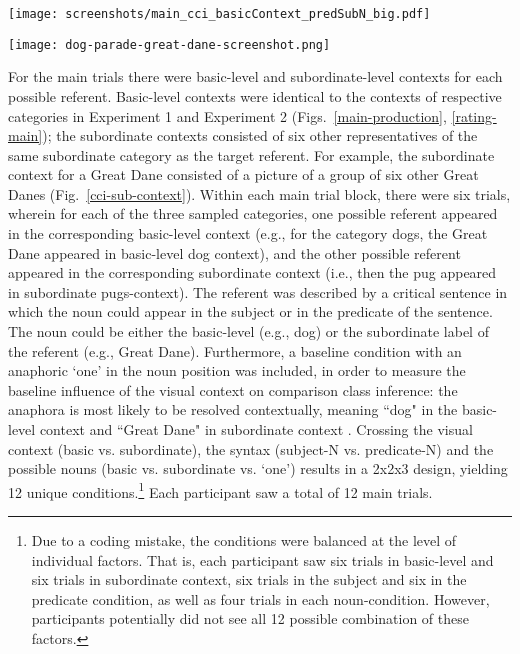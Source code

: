 \begin{figure*}[t]
	\begin{center}
		\texttt{[image: screenshots/main\_cci\_basicContext\_predSubN\_big.pdf]}
	\end{center}
	\vspace{-0.5cm}
	\caption{Example view of a comparison class inference main trial: Participants paraphrased the critical utterance with a subordinate noun in predicate position, which appeared in basic-level context, describing a large-subordinate target.}
	\label{main-cci}
\end{figure*}
\begin{figure*}[t]
	\begin{center}
		\texttt{[image: dog-parade-great-dane-screenshot.png]}
	\end{center}
	\caption{Example view of a subordinate context: For the category Great Danes, the context depicts six different Great Danes.}
	\label{cci-sub-context}
\end{figure*}
For the main trials there were basic-level and subordinate-level contexts for each possible referent. Basic-level contexts were identical to the contexts of respective categories in Experiment 1 and Experiment 2 (Figs.~\ref{main-production}, \ref{rating-main}); the subordinate contexts consisted of six other representatives of the same subordinate category as the target referent. For example, the subordinate context for a Great Dane consisted of a picture of a group of six other Great Danes (Fig.~\ref{cci-sub-context}). Within each main trial block, there were six trials, wherein for each of the three sampled categories, one possible referent appeared in the corresponding basic-level context (e.g., for the category dogs, the Great Dane appeared in basic-level dog context), and the other possible referent appeared in the corresponding subordinate context (i.e., then the pug appeared in subordinate pugs-context). 
The referent was described by a critical sentence in which the noun could appear in the subject or in the predicate of the sentence. The noun could be either the basic-level (e.g., dog) or the subordinate label of the referent (e.g., Great Dane). Furthermore, a baseline condition with an anaphoric ‘one’ in the noun position was included, in order to measure the baseline influence of the visual context on comparison class inference: the anaphora is most likely to be resolved contextually, meaning ``dog" in the basic-level context and ``Great Dane" in subordinate context \parencite{goldberg2017one}. Crossing the visual context (basic vs. subordinate), the syntax (subject-N vs. predicate-N) and the possible nouns (basic vs. subordinate vs. ‘one’) results in a 2x2x3 design, yielding 12 unique conditions.\footnote{Due to a coding mistake, the conditions were balanced at the level of individual factors. That is, each participant saw six trials in basic-level and six trials in subordinate context, six trials in the subject and six in the predicate condition, as well as four trials in each noun-condition. However, participants potentially did not see all 12 possible combination of these factors.}
Each participant saw a total of 12 main trials.   

